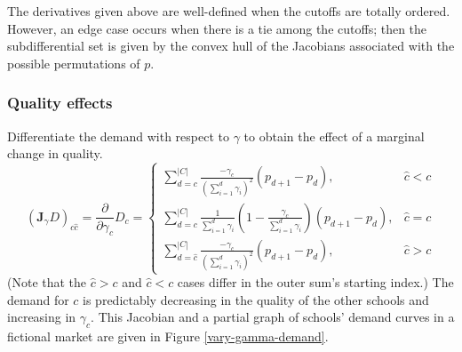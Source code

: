 \documentclass[12pt]{article}
\numberwithin{equation}{subsection}
\theoremstyle{definition}
\begin{document}
The derivatives given above are well-defined when the cutoffs are totally ordered. However, an edge case occurs when there is a tie among the cutoffs; then the subdifferential set is given by the convex hull of the Jacobians associated with the possible permutations of $p$. %

\subsubsection{Quality effects} \label{unconstrainedqualityeffects}
Differentiate the demand with respect to $\gamma$ to obtain the effect of a marginal change in quality.
\begin{equation} \label{jac-gamma-demand-uncons}
\left(\mathbf{J}_\gamma D \right)_{c\hat c} =
\frac{\partial}{\partial\gamma_{\hat c}} D_c = \begin{cases}
\sum_{d=c}^{|C|} \frac{-\gamma_c}{\left(\sum_{i=1}^{d} \gamma_i \right)^2} \left(p_{d+1} - p_d \right), & \hat c < c \\
\sum_{d=c}^{|C|} \frac{1}{\sum_{i=1}^{d} \gamma_i}
    \left( 1 - \frac{\gamma_c}{\sum_{i=1}^{d}\gamma_i }\right)
    \left(p_{d+1} - p_d \right), & \hat c = c\\
\sum_{d=\hat c}^{|C|} \frac{-\gamma_c}{\left(\sum_{i=1}^{d}\gamma_i \right)^2} \left(p_{d+1} - p_d \right), & \hat c > c
\end{cases}
\end{equation}
(Note that the $\hat c > c$ and $ \hat c < c$ cases differ in the outer sum's starting index.) The demand for $c$ is predictably decreasing in the quality of the other schools and increasing in $\gamma_c$. This Jacobian and a partial graph of schools’ demand curves in a fictional market are given in Figure \ref{vary-gamma-demand}. 
\end{document}
